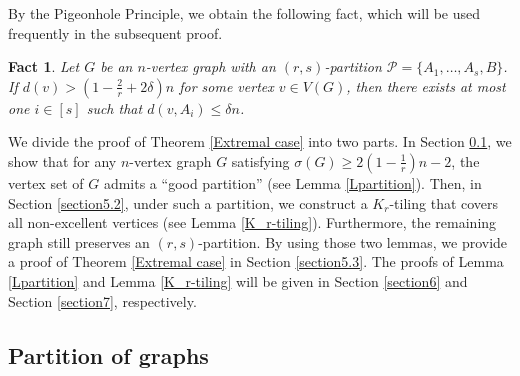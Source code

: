 \documentclass[11pt, a4paper]{article}
\newtheorem{fact}[theorem]{Fact}
\theoremstyle{definition}
\newcommand{\<}{\subseteq}
\begin{document}
By the Pigeonhole Principle, we obtain the following fact, which will be used frequently in the subsequent proof. 
\begin{fact}\label{ExFact}
   Let $G$ be an $n$-vertex graph with an $(r,s)$-partition $\mathcal{P}=\{A_1,\ldots,A_s,B\}$. If $d(v)> (1-\frac{2}{r}+2\delta)n$ for some vertex $v\in V(G)$, then there exists at most one $i\in[s]$ such that $d(v,A_i)\le \delta n$. %
\end{fact}


We divide the proof of Theorem \ref{Extremal case} into two parts. In Section \ref{section5.1}, we show that for any $n$-vertex graph $G$ satisfying $\sigma(G) \geq 2\left(1-\frac{1}{r}\right)n - 2$, the vertex set of $G$ admits a ``good partition'' (see Lemma \ref{Lpartition}). Then, in Section \ref{section5.2}, under such a partition, we construct a $K_r$-tiling that covers all non-excellent vertices (see Lemma \ref{K_r-tiling}). Furthermore, the remaining graph still preserves an $(r,s)$-partition. 
By using those two lemmas, we provide a proof of Theorem \ref{Extremal case} in Section \ref{section5.3}. The proofs of Lemma \ref{Lpartition} and Lemma \ref{K_r-tiling} will be given in Section \ref{section6} and Section \ref{section7}, respectively. 



\subsection{Partition of graphs}\label{section5.1}
\end{document}
